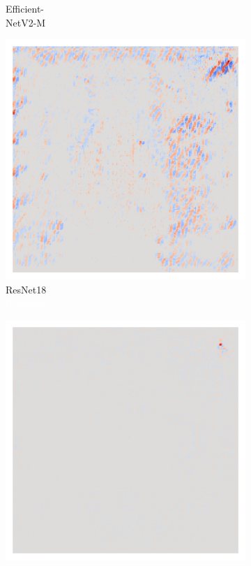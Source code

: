\begin{figure}[H]
\begin{subfigure}{0.16\linewidth}
        \caption{Efficient-\\NetV2-M}
    \end{subfigure}\hfill%
    \begin{subfigure}{0.16\linewidth}
        \centering
        \includegraphics[height=1\linewidth]{01-images/05-resultate/uap_resnet18/uap0-resnet18-covidx_data-n200-robustificationslevel0.png}
        \caption{ResNet18\\\textcolor{white}{Rameidon}}
    \end{subfigure}\hfill%
    \begin{subfigure}{0.16\linewidth}
        \centering
        \includegraphics[height=1\linewidth]{01-images/05-resultate/uap_resnet50/uap0-resnet50-covidx_data-n200-robustificationslevel0.png}

\end{subfigure}
\end{figure}
